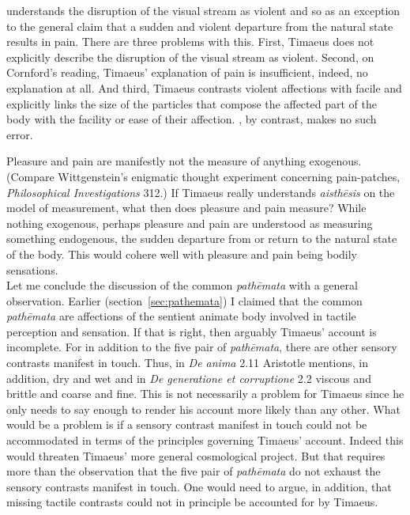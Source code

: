 \citet[269]{Cornford:1935fk} understands the disruption of the visual stream as violent and so as an exception to the general claim that a sudden and violent departure from the natural state results in pain. There are three problems with this. First, Timaeus does not explicitly describe the disruption of the visual stream as violent. Second, on Cornford's reading, Timaeus' explanation of pain is insufficient, indeed, no explanation at all. And third, Timaeus contrasts violent affections with facile and explicitly links the size of the particles that compose the affected part of the body with the facility or ease of their affection. \citet[447]{Taylor:1928qb}, by contrast, makes no such error.

Pleasure and pain are manifestly not the measure of anything exogenous. (Compare Wittgenstein's enigmatic thought experiment concerning pain-patches, \emph{Philosophical Investigations} 312.) If Timaeus really understands \emph{aisthēsis} on the model of measurement, what then does pleasure and pain measure? While nothing exogenous, perhaps pleasure and pain are understood as measuring something endogenous, the sudden departure from or return to the natural state of the body. This would cohere well with pleasure and pain being bodily sensations.\\

\noindent Let me conclude the discussion of the common \emph{pathēmata} with a general observation. Earlier (section~\ref{sec:pathemata}) I claimed that the common \emph{pathēmata} are affections of the sentient animate body involved in tactile perception and sensation. If that is right, then arguably Timaeus' account is incomplete. For in addition to the five pair of \emph{pathēmata}, there are other sensory contrasts manifest in touch. Thus, in \emph{De anima} 2.11 Aristotle mentions, in addition, dry and wet and in \emph{De generatione et corruptione} 2.2 viscous and brittle and coarse and fine. This is not necessarily a problem for Timaeus since he only needs to say enough to render his account more likely than any other. What would be a problem is if a sensory contrast manifest in touch could not be accommodated in terms of the principles governing Timaeus' account. Indeed this would threaten Timaeus' more general cosmological project. But that requires more than the observation that the five pair of \emph{pathēmata} do not exhaust the sensory contrasts manifest in touch. One would need to argue, in addition, that missing tactile contrasts could not in principle be accounted for by Timaeus.



